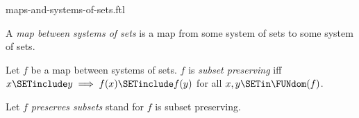 \documentclass{naproche-library}
\begin{document}
\begin{smodule}[title=Maps and Systems of Sets]{maps-and-systems-of-sets.ftl}


\begin{definition}[forthel,id=FOUNDATIONS_10_1394550966845440]
  A \emph{map between systems of sets} is a map from some system of sets to some system of sets.
\end{definition}

\begin{definition}[forthel,id=FOUNDATIONS_10_3290499861446656]
  Let $f$ be a map between systems of sets.
  $f$ is \emph{subset preserving} iff $x \SETinclude y \implies f(x) \SETinclude f(y)$ for all $x, y \SETin \FUNdom(f)$.

  Let $f$ \emph{preserves subsets} stand for $f$ is subset preserving.
\end{definition}
\end{smodule}
\end{document}
